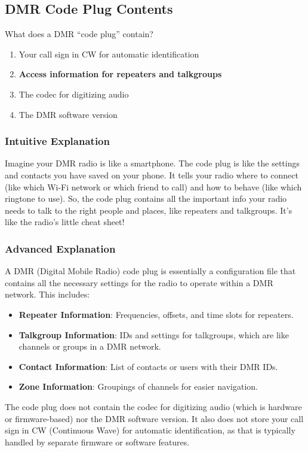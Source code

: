 \subsection{DMR Code Plug Contents}
\label{T4B07}

\begin{tcolorbox}[colback=gray!10!white,colframe=black!75!black,title=T4B07]
What does a DMR “code plug” contain?
\begin{enumerate}[label=\Alph*)]
    \item Your call sign in CW for automatic identification
    \item \textbf{Access information for repeaters and talkgroups}
    \item The codec for digitizing audio
    \item The DMR software version
\end{enumerate}
\end{tcolorbox}

\subsubsection{Intuitive Explanation}
Imagine your DMR radio is like a smartphone. The code plug is like the settings and contacts you have saved on your phone. It tells your radio where to connect (like which Wi-Fi network or which friend to call) and how to behave (like which ringtone to use). So, the code plug contains all the important info your radio needs to talk to the right people and places, like repeaters and talkgroups. It’s like the radio’s little cheat sheet!

\subsubsection{Advanced Explanation}
A DMR (Digital Mobile Radio) code plug is essentially a configuration file that contains all the necessary settings for the radio to operate within a DMR network. This includes:

\begin{itemize}
    \item \textbf{Repeater Information}: Frequencies, offsets, and time slots for repeaters.
    \item \textbf{Talkgroup Information}: IDs and settings for talkgroups, which are like channels or groups in a DMR network.
    \item \textbf{Contact Information}: List of contacts or users with their DMR IDs.
    \item \textbf{Zone Information}: Groupings of channels for easier navigation.
\end{itemize}

The code plug does not contain the codec for digitizing audio (which is hardware or firmware-based) nor the DMR software version. It also does not store your call sign in CW (Continuous Wave) for automatic identification, as that is typically handled by separate firmware or software features.

